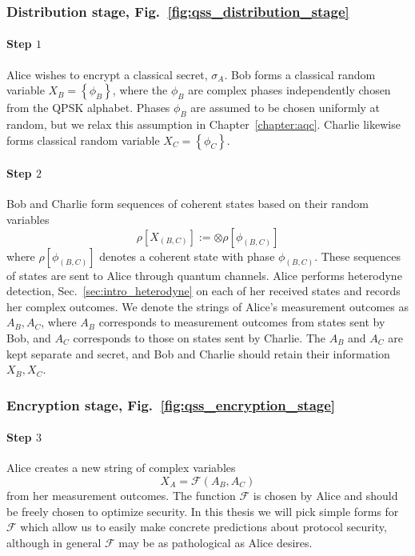 
\subsubsection*{Distribution stage, Fig.~\ref{fig:qss_distribution_stage}}
\paragraph{Step $1$}
Alice wishes to encrypt a classical secret, $\sigma_A$. Bob forms a classical random variable $X_B = \left\{\phi_B\right\}$, where the $\phi_B$ are complex phases independently chosen from the QPSK alphabet. Phases $\phi_B$ are assumed to be chosen uniformly at random, but we relax this assumption in Chapter~\ref{chapter:aqc}. Charlie likewise forms classical random variable $X_C = \left\{\phi_C\right\}$.

\paragraph{Step $2$}
Bob and Charlie form sequences of coherent states based on their random variables
\begin{equation}
\rho\left[X_{\left(B, C\right)}\right] := \otimes \rho\left[\phi_{\left(B, C\right)}\right]
\end{equation}
where $\rho\left[\phi_{\left(B, C\right)}\right]$ denotes a coherent state with phase $\phi_{\left(B, C\right)}$. These sequences of states are sent to Alice through quantum channels. %
Alice performs heterodyne detection, Sec.~\ref{sec:intro_heterodyne} on each of her received states and records her complex outcomes. We denote the strings of Alice's measurement outcomes as $A_B, A_C$, where $A_B$ corresponds to measurement outcomes from states sent by Bob, and $A_C$ corresponds to those on states sent by Charlie. The $A_B$ and $A_C$ are kept separate and secret, and Bob and Charlie should retain their information $X_B, X_C$.

\subsubsection*{Encryption stage, Fig.~\ref{fig:qss_encryption_stage}}

\paragraph{Step $3$} Alice creates a new string of complex variables
\begin{equation}
X_A = \mathcal{F}\left(A_B, A_C\right)
\end{equation}
from her measurement outcomes. The function $\mathcal{F}$ is chosen by Alice and should be freely chosen to optimize security. In this thesis we will pick simple forms for $\mathcal{F}$ which allow us to easily make concrete predictions about protocol security, although in general $\mathcal{F}$ may be as pathological as Alice desires.

